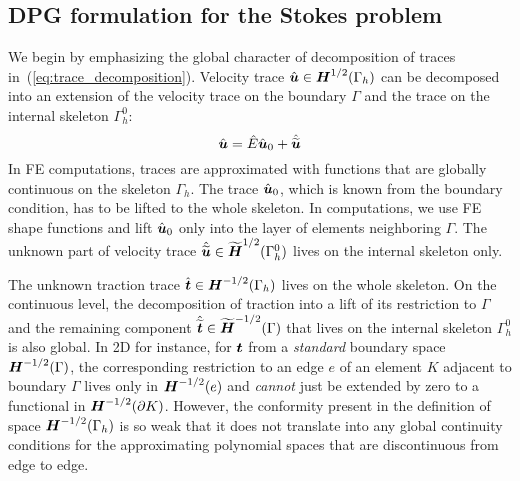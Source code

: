 \subsection{DPG formulation for the Stokes problem}

We begin by emphasizing the global character of decomposition of traces in~(\ref{eq:trace_decomposition}).
Velocity trace $\hat{\bfu} \in \bfH^{1/2}(\Gamma_h)$ can be decomposed into 
an extension of the velocity trace on the boundary $\Gamma$
and the trace on the internal skeleton $\Gamma_h^0$:
\[
\hat{\bfu} = \hat{E} \hat{\bfu}_0 + \hat{\tilde{\bfu}}
\]
In FE computations, traces are approximated with functions that are globally continuous
on the skeleton $\Gamma_h$.
The trace $\hat{\bfu}_0$, which is known from the boundary condition, has to be lifted to the whole skeleton.
In computations, we use FE shape functions and lift $\hat{\bfu}_0$ only into the
 layer of elements neighboring $\Gamma$.
The unknown part of velocity trace $\hat{\tilde{\bfu}} \in \tilde{\bfH}^{1/2}(\Gamma^0_h)$ 
lives on the internal skeleton only.

The unknown traction trace $\hat{\bft} \in \bfH^{-1/2}(\Gamma_h)$ lives on the whole skeleton.
On the continuous level, the decomposition of traction into 
a lift of its restriction to $\Gamma$ and the remaining component $\hat{\tilde{\bft}} 
\in \tilde{\bfH}^{-1/2}(\Gamma)$ that lives on the internal skeleton $\Gamma_h^0$ is also global.
In 2D for instance, 
for $\bft$ from a {\em standard} boundary space $\bfH^{-1/2}(\Gamma)$, the corresponding
restriction to an edge $e$ of an element $K$ adjacent to boundary $\Gamma$ lives only in $\bfH^{-1/2}(e)$
and {\em cannot} just be extended by zero to a functional in $\bfH^{-1/2}(\ptl K)$.
However, the conformity present in the definition of space $\bfH^{-1/2}(\Gamma_h)$ is so weak 
that it does
not translate into any global continuity conditions for the approximating polynomial spaces that
are discontinuous from edge to edge.

